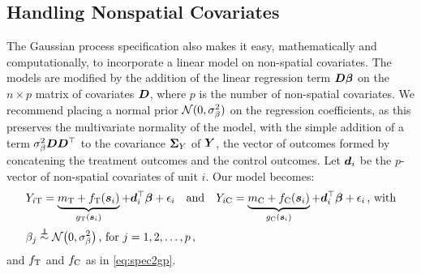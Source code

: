 \documentclass[12pt]{article}
\begin{document}
\subsection{Handling Nonspatial Covariates}
\label{sec:covariates}

The Gaussian process specification also makes it easy, mathematically and computationally, to incorporate a linear model on non-spatial covariates.
The models are modified by the addition of the linear regression term \(\bm{D} \bm{\beta}\) on the \(n \times p\) matrix of covariates \(\bm{D}\), where \(p\) is the number of non-spatial covariates.
We recommend placing a normal prior \(\operatorname{\mathcal{N}}(0,\sigma_{\beta}^2)\) on the regression coefficients, as this preserves the multivariate normality of the model, with the simple addition of a term \(\sigma_\beta^2 \bm{D} \bm{D}^{\top}\) to the covariance \(\bm{\Sigma}_Y\) of \(\bm{Y}\), the vector of outcomes formed by concatening the treatment outcomes and the control outcomes.
Let \(\bm{d}_i\) be the \(p\)-vector of non-spatial covariates of unit \(i\).
Our model becomes:
\begin{equation}
    \begin{split}
        & Y_{i\treat} = \underbrace{m_\treat{} + f_\treat{}(\svec_i)}_{g_\treat{}(\svec_i)} + \dvec_i\trans \betavec + \epsilon_i \quad\text{and}\quad
        Y_{i\ctrol} = \underbrace{m_\ctrol{} + f_\ctrol{}(\svec_i)}_{g_\ctrol{}(\svec_i)} + \dvec_i\trans \betavec + \epsilon_i \,\text{, with} \\
        & \beta_j \overset{\indep}{\sim} \normal\del{0,\sigmabeta^2}\,\text{, for }j=1,2,\dotsc,p \,,
    \end{split}
    \label{eq:covariates_model}
\end{equation}
and \(f_{\mathrm{T}}\) and \(f_{\mathrm{C}}\) as in \autoref{eq:spec2gp}.
\end{document}
